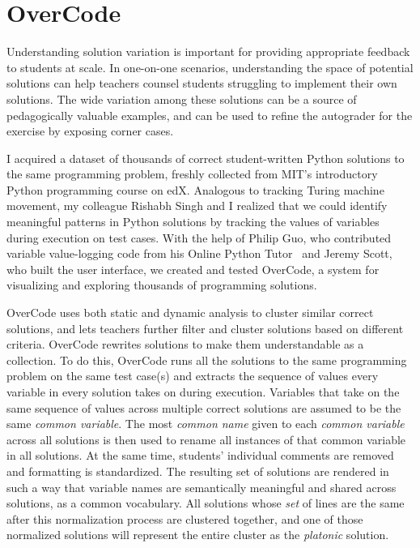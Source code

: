 \section{OverCode}

Understanding solution variation is important for providing appropriate feedback to students at scale. In one-on-one scenarios, understanding the space of potential solutions can help teachers counsel students struggling to implement their own solutions. The wide variation among these solutions can be a source of pedagogically valuable examples, and can be used to refine the autograder for the exercise by exposing corner cases. 

I acquired a dataset of thousands of correct student-written Python solutions to the same programming problem, freshly collected from MIT's introductory Python programming course on edX. Analogous to tracking Turing machine movement, my colleague Rishabh Singh and I realized that we could identify meaningful patterns in Python solutions by tracking the values of variables during execution on test cases. With the help of Philip Guo, who contributed variable value-logging code from his Online Python Tutor~\cite{pgbovineOPT} and Jeremy Scott, who built the user interface, we created and tested OverCode, a system for visualizing and exploring thousands of programming solutions.

OverCode uses both static and dynamic analysis to cluster similar correct solutions, and lets teachers further filter and cluster solutions based on different criteria. OverCode rewrites solutions to make them understandable as a collection. To do this, OverCode runs all the solutions to the same programming problem on the same test case(s) and extracts the sequence of values every variable in every solution takes on during execution. Variables that take on the same sequence of values across multiple correct solutions are assumed to be the same {\it common variable}. The most {\it common name} given to each {\it common variable} across all solutions is then used to rename all instances of that common variable in all solutions. At the same time, students' individual comments are removed and formatting is standardized. The resulting set of solutions are rendered in such a way that variable names are semantically meaningful and shared across solutions, as a common vocabulary. All solutions whose {\it set} of lines are the same after this normalization process are clustered together, and one of those normalized solutions will represent the entire cluster as the {\it platonic} solution. %

